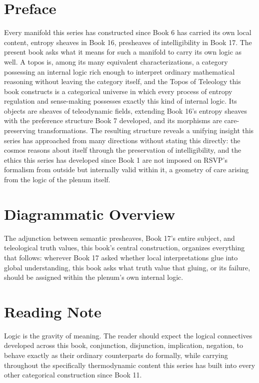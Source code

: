 \chapter*{Preface}

Every manifold this series has constructed since Book 6 has carried its own local content, entropy sheaves in Book 16, presheaves of intelligibility in Book 17. The present book asks what it means for such a manifold to carry its own logic as well. A topos is, among its many equivalent characterizations, a category possessing an internal logic rich enough to interpret ordinary mathematical reasoning without leaving the category itself, and the Topos of Teleology this book constructs is a categorical universe in which every process of entropy regulation and sense-making possesses exactly this kind of internal logic. Its objects are sheaves of teleodynamic fields, extending Book 16's entropy sheaves with the preference structure Book 7 developed, and its morphisms are care-preserving transformations. The resulting structure reveals a unifying insight this series has approached from many directions without stating this directly: the cosmos reasons about itself through the preservation of intelligibility, and the ethics this series has developed since Book 1 are not imposed on RSVP's formalism from outside but internally valid within it, a geometry of care arising from the logic of the plenum itself.

\chapter*{Diagrammatic Overview}

The adjunction between semantic presheaves, Book 17's entire subject, and teleological truth values, this book's central construction, organizes everything that follows: wherever Book 17 asked whether local interpretations glue into global understanding, this book asks what truth value that gluing, or its failure, should be assigned within the plenum's own internal logic.

\chapter*{Reading Note}

Logic is the gravity of meaning. The reader should expect the logical connectives developed across this book, conjunction, disjunction, implication, negation, to behave exactly as their ordinary counterparts do formally, while carrying throughout the specifically thermodynamic content this series has built into every other categorical construction since Book 11.

